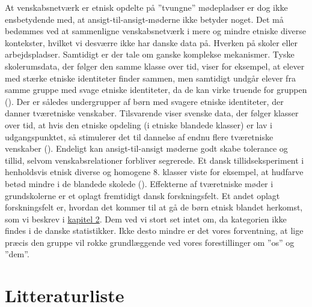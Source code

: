 \documentclass[
]{book}
\begin{document}
At venskabsnetværk er etnisk opdelte på ''tvungne'' mødepladser er dog ikke ensbetydende med, at ansigt-til-ansigt-møderne ikke betyder noget. Det må bedømmes ved at sammenligne venskabsnetværk i mere og mindre etniske diverse kontekster, hvilket vi desværre ikke har danske data på. Hverken på skoler eller arbejdspladser. Samtidigt er der tale om ganske komplekse mekanismer. Tyske skolerumsdata, der følger den samme klasse over tid, viser for eksempel, at elever med stærke etniske identiteter finder sammen, men samtidigt undgår elever fra samme gruppe med svage etniske identiteter, da de kan virke truende for gruppen (). Der er således undergrupper af børn med svagere etniske identiteter, der danner tværetniske venskaber. Tilsvarende viser svenske data, der følger klasser over tid, at hvis den etniske opdeling (i etniske blandede klasser) er lav i udgangspunktet, så stimulerer det til dannelse af endnu flere tværetniske venskaber (). Endeligt kan ansigt-til-ansigt møderne godt skabe tolerance og tillid, selvom venskabsrelationer forbliver segrerede. Et dansk tillidseksperiment i henholdsvis etnisk diverse og homogene 8. klasser viste for eksempel, at hudfarve betød mindre i de blandede skolede (). Effekterne af tværetniske møder i grundskolerne er et oplagt fremtidigt dansk forskningsfelt. Et andet oplagt forskningsfelt er, hvordan det kommer til at gå de børn etnisk blandet herkomst, som vi beskrev i \hyperref[kap2]{kapitel 2}. Dem ved vi stort set intet om, da kategorien ikke findes i de danske statistikker. Ikke desto mindre er det vores forventning, at lige præcis den gruppe vil rokke grundlæggende ved vores forestillinger om ''os'' og ''dem''.

\chapter*{Litteraturliste}\label{litteraturliste}
\end{document}
